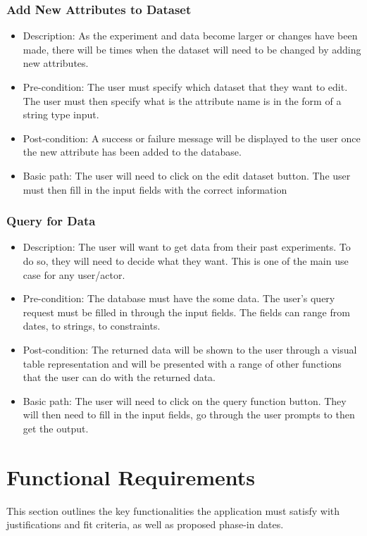 \documentclass[12pt]{article}
\begin{document}
\subsubsection{Add New Attributes to Dataset}
\begin{itemize}
  \item Description: As the experiment and data become larger or changes have
  been made, there will be times when the dataset will need to be changed by
  adding new attributes.  
  \item Pre-condition: The user must specify which dataset that they want to
  edit. The user must then specify what is the attribute name is in the form of
  a string type input. 
  \item Post-condition: A success or failure message will be displayed to the
  user once the new attribute has been added to the database. 
  \item Basic path: The user will need to click on the edit dataset button. The
  user must then fill in the input fields with the correct information
\end{itemize}

\subsubsection{Query for Data}
\begin{itemize}
  \item Description: The user will want to get data from their past experiments.
  To do so, they will need to decide what they want. This is one of the main use
  case for any user/actor. 
  \item Pre-condition: The database must have the some data. The user's query
  request must be filled in through the input fields. The fields can range from
  dates, to strings, to constraints. 
  \item Post-condition: The returned data will be shown to the user through a
  visual table representation and will be presented with a range of other
  functions that the user can do with the returned data.  
  \item Basic path: The user will need to click on the query function button.
  They will then need to fill in the input fields, go through the user prompts
  to then get the output.
\end{itemize}

\section{Functional Requirements}
This section outlines the key functionalities the application must satisfy with justifications and fit criteria, as well as proposed phase-in dates.
\end{document}
